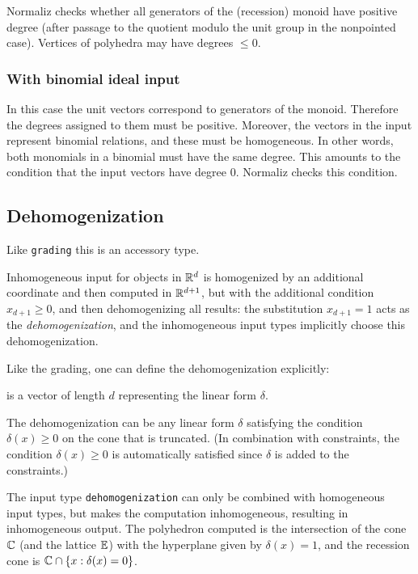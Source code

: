 Normaliz checks whether all generators of the (recession) monoid have
positive degree (after passage to the quotient modulo the unit group in the nonpointed case).
Vertices of polyhedra may have degrees $\le 0$.

\subsubsection{With binomial ideal input}\label{grad_lattid}

In this case the unit vectors correspond to generators of the
monoid. Therefore the degrees assigned to them must be
positive. Moreover, the vectors in the input represent binomial
relations, and these must be homogeneous. In other words, both
monomials in a binomial must have the same degree. This amounts
to the condition that the input vectors have degree $0$.
Normaliz checks this condition.

\subsection{Dehomogenization}

Like \verb|grading| this is an accessory type.

Inhomogeneous input for objects in ${\mathbb R}^d$ is homogenized by an additional coordinate and then computed in ${\mathbb R}^{d+1}$, but with the additional condition $x_{d+1}\ge 0$, and then dehomogenizing all results: the substitution $x_{d+1}=1$ acts as the \emph{dehomogenization}, and the inhomogeneous input types implicitly choose this dehomogenization.

Like the grading, one can define the dehomogenization explicitly:
\begin{itemize}
	\itemtt[dehomogenization] is a vector of length $d$ representing the linear form $\delta$.
\end{itemize}

The dehomogenization can be any linear form $\delta$ satisfying the condition $\delta(x)\ge 0$ on the cone that is truncated. (In combination with constraints, the condition $\delta(x)\ge 0$ is automatically satisfied since $\delta$ is added to the constraints.)

The input type \verb|dehomogenization| can only be combined with homogeneous input types, but makes the computation inhomogeneous, resulting in inhomogeneous output. The polyhedron computed is the intersection of the cone ${\mathbb C}$ (and the lattice ${\mathbb E}$) with the hyperplane given by $\delta(x)=1$, and the recession cone is ${\mathbb C}\cap\{x:\delta(x)=0\}$.

